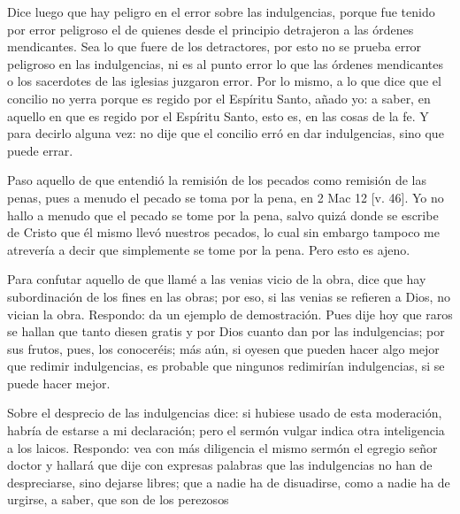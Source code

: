 Dice luego que hay peligro en el error sobre las indulgencias, porque fue tenido por error peligroso el de quienes desde el principio detrajeron a las órdenes mendicantes. Sea lo que fuere de los detractores, por esto no se prueba error peligroso en las indulgencias, ni es al punto error lo que las órdenes mendicantes o los sacerdotes de las iglesias juzgaron error. Por lo mismo, a lo que dice que el concilio no yerra porque es regido por el Espíritu Santo, añado yo: a saber, en aquello en que es regido por el Espíritu Santo, esto es, en las cosas de la fe. Y para decirlo alguna vez: no dije que el concilio erró en dar indulgencias, sino que puede errar.

Paso aquello de que entendió la remisión de los pecados como remisión de las penas, pues a menudo el pecado se toma por la pena, en 2 Mac 12 [v. 46]. Yo no hallo a menudo que el pecado se tome por la pena, salvo quizá donde se escribe de Cristo que él mismo llevó nuestros pecados, lo cual sin embargo tampoco me atrevería a decir que simplemente se tome por la pena. Pero esto es ajeno.

Para confutar aquello de que llamé a las venias vicio de la obra, dice que hay subordinación de los fines en las obras; por eso, si las venias se refieren a Dios, no vician la obra. Respondo: da un ejemplo de demostración. Pues dije hoy que raros se hallan que tanto diesen gratis y por Dios cuanto dan por las indulgencias; por sus frutos, pues, los conoceréis; más aún, si oyesen que pueden hacer algo mejor que redimir indulgencias, es probable que ningunos redimirían indulgencias, si se puede hacer mejor.

Sobre el desprecio de las indulgencias dice: si hubiese usado de esta moderación, habría de estarse a mi declaración; pero el sermón vulgar indica otra inteligencia a los laicos. Respondo: vea con más diligencia el mismo sermón el egregio señor doctor y hallará que dije con expresas palabras que las indulgencias no han de despreciarse, sino dejarse libres; que a nadie ha de disuadirse, como a nadie ha de urgirse, a saber, que son de los perezosos

